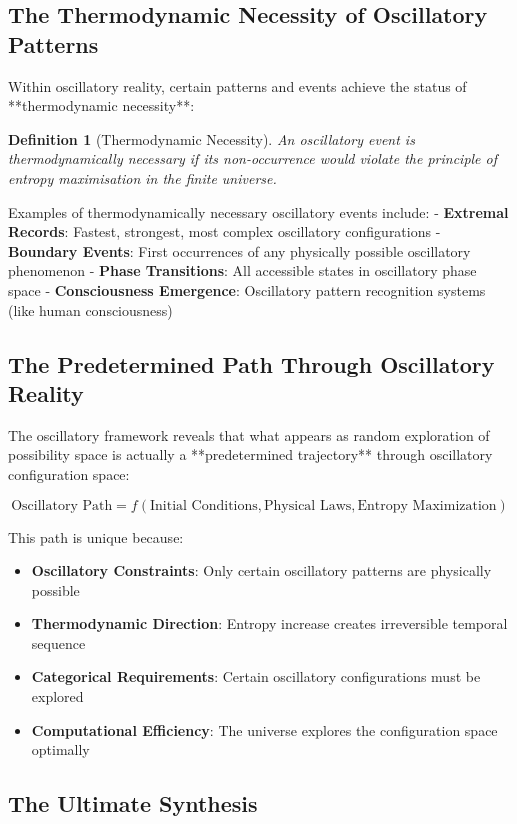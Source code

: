 \documentclass[11pt]{article}
\newtheorem{definition}[theorem]{Definition}
\theoremstyle{remark}
\begin{document}
\subsection{The Thermodynamic Necessity of Oscillatory Patterns}

Within oscillatory reality, certain patterns and events achieve the status of **thermodynamic necessity**:

\begin{definition}[Thermodynamic Necessity]
An oscillatory event is thermodynamically necessary if its non-occurrence would violate the principle of entropy maximisation in the finite universe.
\end{definition}

Examples of thermodynamically necessary oscillatory events include:
- \textbf{Extremal Records}: Fastest, strongest, most complex oscillatory configurations
- \textbf{Boundary Events}: First occurrences of any physically possible oscillatory phenomenon  
- \textbf{Phase Transitions}: All accessible states in oscillatory phase space
- \textbf{Consciousness Emergence}: Oscillatory pattern recognition systems (like human consciousness)

\subsection{The Predetermined Path Through Oscillatory Reality}

The oscillatory framework reveals that what appears as random exploration of possibility space is actually a **predetermined trajectory** through oscillatory configuration space:

$$\text{Oscillatory Path} = f(\text{Initial Conditions}, \text{Physical Laws}, \text{Entropy Maximization})$$

This path is unique because:
\begin{itemize}
\item \textbf{Oscillatory Constraints}: Only certain oscillatory patterns are physically possible
\item \textbf{Thermodynamic Direction}: Entropy increase creates irreversible temporal sequence
\item \textbf{Categorical Requirements}: Certain oscillatory configurations must be explored
\item \textbf{Computational Efficiency}: The universe explores the configuration space optimally
\end{itemize}

\subsection{The Ultimate Synthesis}
\end{document}
